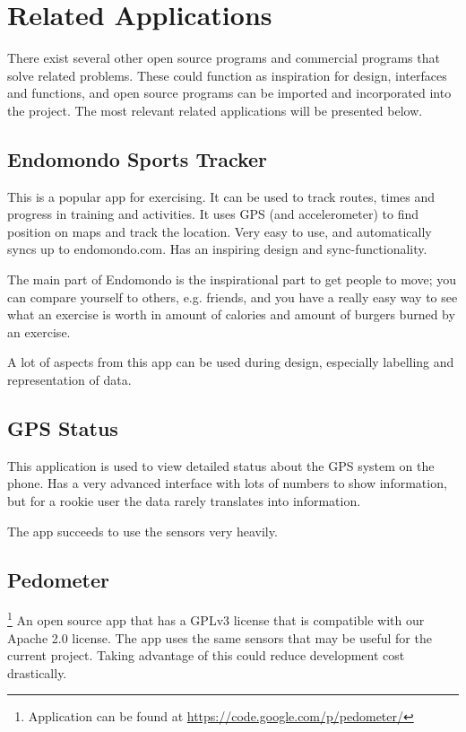 \section{Related Applications}
There exist several other open source programs and commercial programs that solve related problems. These could function as inspiration for design, interfaces and functions, and open source programs can be imported and incorporated into the project. The most relevant related applications will be presented below.

\subsection{Endomondo Sports Tracker}
This is a popular app for exercising. It can be used to track routes, times and progress in training and activities. It uses GPS (and accelerometer) to find position on maps and track the location. Very easy to use, and automatically syncs up to endomondo.com. Has an inspiring design and sync-functionality.

The main part of Endomondo is the inspirational part to get people to move; you can compare yourself to others, e.g. friends, and you have a really easy way to see what an exercise is worth in amount of calories and amount of burgers burned by an exercise.

A lot of aspects from this app can be used during design, especially labelling and representation of data.

\subsection{GPS Status}
This application is used to view detailed status about the GPS system on the phone. Has a very advanced interface with lots of numbers to show information, but for a rookie user the data rarely translates into information.

The app succeeds to use the sensors very heavily.

\subsection{Pedometer}\footnote{Application can be found at \url{https://code.google.com/p/pedometer/}}
An open source app that has a GPLv3 license that is compatible with our Apache 2.0 license. The app uses the same sensors that may be useful for the current project. Taking advantage of this could reduce development cost drastically.

